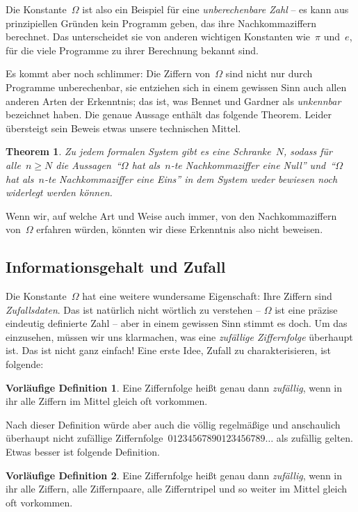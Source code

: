 \documentclass[twoside]{../zirkelblatt1415}
\theoremstyle{definition}
\newtheorem{defn'}{Vorläufige Definition}[section]
\theoremstyle{plain}
\newtheorem{thm}[defn]{Theorem}
\theoremstyle{remark}
\begin{document}
Die Konstante~$\Omega$ ist also ein Beispiel für eine \emph{unberechenbare
Zahl} -- es kann aus prinzipiellen Gründen kein Programm geben, das ihre
Nachkommaziffern berechnet. Das unterscheidet sie von anderen wichtigen
Konstanten wie~$\pi$ und~$e$, für die viele Programme zu ihrer Berechnung
bekannt sind.

Es kommt aber noch schlimmer: Die Ziffern von~$\Omega$ sind nicht nur durch
Programme unberechenbar, sie entziehen sich in einem gewissen Sinn auch allen
anderen Arten der Erkenntnis; das ist, was Bennet und Gardner als
\emph{unkennbar} bezeichnet haben. Die genaue Aussage enthält das folgende
Theorem. Leider übersteigt sein Beweis etwas unsere technischen Mittel.

\begin{thm}Zu jedem formalen System gibt es eine Schranke~$N$, sodass für
alle~$n \geq N$ die Aussagen~"`$\Omega$ hat als~$n$-te Nachkommaziffer eine
Null"' und~"`$\Omega$ hat als~$n$-te Nachkommaziffer eine Eins"' in dem System
weder bewiesen noch widerlegt werden können.
\end{thm}

Wenn wir, auf welche Art und Weise auch immer, von den Nachkommaziffern
von~$\Omega$ erfahren würden, könnten wir diese Erkenntnis also nicht beweisen.


\subsection{Informationsgehalt und Zufall}

Die Konstante~$\Omega$ hat eine weitere wundersame Eigenschaft: Ihre
Ziffern sind \emph{Zufallsdaten}. Das ist natürlich nicht wörtlich zu verstehen
-- $\Omega$ ist eine präzise eindeutig definierte Zahl -- aber in einem
gewissen Sinn stimmt es doch. Um das einzusehen, müssen wir uns klarmachen, was
eine \emph{zufällige Ziffernfolge} überhaupt ist. Das ist nicht ganz einfach!
Eine erste Idee, Zufall zu charakterisieren, ist folgende:

\begin{defn'}Eine Ziffernfolge heißt genau dann \emph{zufällig}, wenn in ihr alle
Ziffern im Mittel gleich oft vorkommen.\end{defn'}

Nach dieser Definition würde aber auch die völlig regelmäßige und anschaulich
überhaupt nicht zufällige Ziffernfolge~$01234567890123456789\ldots$ als
zufällig gelten. Etwas besser ist folgende Definition.

\begin{defn'}Eine Ziffernfolge heißt genau dann \emph{zufällig}, wenn in ihr alle
Ziffern, alle Ziffernpaare, alle Zifferntripel und so weiter im Mittel gleich
oft vorkommen.\end{defn'}
\end{document}
